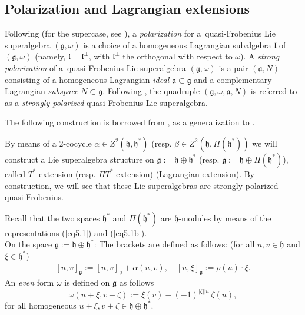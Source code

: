 \documentclass[12pt]{amsart}
\newcommand{\fa}{\mathfrak{a}}
\newcommand{\fg}{\mathfrak{g}}
\begin{document}
\subsection{Polarization and Lagrangian extensions}\label{Lagrangian}
Following \cite{BC} (for the supercase, see \cite{BBE, BM}), a {\it polarization} for a~quasi-Frobenius Lie superalgebra $(\mathfrak{g}, \omega)$ is a choice of a homogeneous Lagrangian subalgebra $\mathfrak{l}$ of $(\fg, \omega)$ (namely, $\mathfrak{l}=\mathfrak{l}^{\perp}$, with $\mathfrak{l}^{\perp}$ the orthogonal with respect to $\omega$). A {\it strong polarization} of a~quasi-Frobenius Lie superalgebra $(\mathfrak{g}, \omega)$ is a pair $(\mathfrak{a}, N)$ consisting of a homogeneous Lagrangian {\it ideal} $\fa\subset \fg$ and a complementary Lagrangian {\it subspace}  $N\subset \fg$. Following \cite{BC}, the quadruple $(\fg, \omega,\fa, N)$ is referred to as a {\it strongly polarized}  quasi-Frobenius Lie superalgebra.

The following construction is borrowed from \cite{BM}, as a generalization to \cite{BC}.

By means of a 2-cocycle $\alpha \in Z^2(\mathfrak{h}, \mathfrak{h}^*)$ (resp. $\beta  \in Z^2(\mathfrak{h}, \Pi(\mathfrak{h}^*))$ we will construct a Lie superalgebra structure on $\mathfrak{g}:=\mathfrak{h}\oplus \mathfrak{h}^*$ (resp. $\mathfrak{g}:=\mathfrak{h}\oplus \Pi(\mathfrak{h}^*)$), called $T^*$-extension (resp. $\Pi T^*$-extension) (Lagrangian extension). By construction, we will see that these Lie superalgebras are strongly polarized quasi-Frobenius. 


Recall that the two spaces $\mathfrak{h}^*$ and $\Pi(\mathfrak{h}^*)$ are $\mathfrak{h}$-modules by means of the representations  (\ref{eq5.1}) and (\ref{eq5.1b}).\\

\underline{On the space $\mathfrak{g}:=\mathfrak{h}\oplus \mathfrak{h}^*$:} The brackets are defined as follows: \textup{(}for all $u, v\in \mathfrak{h}$ and $\xi\in \mathfrak{h}^*$\textup{)}
\[
\begin{array}{l}
 [u,v]_\mathfrak{g}  :=  [u,v]_{\mathfrak{h}} +  \alpha(u,v), \quad [u,\xi]_{\mathfrak{g}} :=  \rho(u) \cdot \xi.
\end{array}
\]
An \emph{even} form $\omega$ is defined on $\mathfrak{g}$ as follows
\begin{equation}\label{omegaTstar}
\omega(u+\xi, v+ \zeta):= \xi(v) - (-1)^{|\zeta|| u|} \zeta(u),
\end{equation}
for all homogeneous $u+\xi, v+\zeta \in \mathfrak{h} \oplus \mathfrak{h}^*$.
\end{document}
